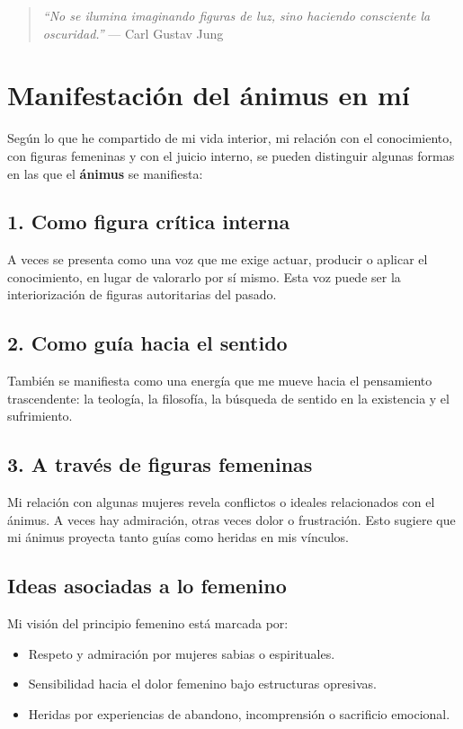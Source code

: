 \documentclass[12pt,a4paper]{article}
\begin{document}
	\begin{quote}
		\textit{“No se ilumina imaginando figuras de luz, sino haciendo consciente la oscuridad.”} — Carl Gustav Jung
	\end{quote}
	
	\section{Manifestación del ánimus en mí}
	
	Según lo que he compartido de mi vida interior, mi relación con el conocimiento, con figuras femeninas y con el juicio interno, se pueden distinguir algunas formas en las que el \textbf{ánimus} se manifiesta:
	
	\subsection*{1. Como figura crítica interna}
	A veces se presenta como una voz que me exige actuar, producir o aplicar el conocimiento, en lugar de valorarlo por sí mismo. Esta voz puede ser la interiorización de figuras autoritarias del pasado.
	
	\subsection*{2. Como guía hacia el sentido}
	También se manifiesta como una energía que me mueve hacia el pensamiento trascendente: la teología, la filosofía, la búsqueda de sentido en la existencia y el sufrimiento.
	
	\subsection*{3. A través de figuras femeninas}
	Mi relación con algunas mujeres revela conflictos o ideales relacionados con el ánimus. A veces hay admiración, otras veces dolor o frustración. Esto sugiere que mi ánimus proyecta tanto guías como heridas en mis vínculos.
	
	\subsection*{Ideas asociadas a lo femenino}
	Mi visión del principio femenino está marcada por:
	
	\begin{itemize}
		\item Respeto y admiración por mujeres sabias o espirituales.
		\item Sensibilidad hacia el dolor femenino bajo estructuras opresivas.
		\item Heridas por experiencias de abandono, incomprensión o sacrificio emocional.
	\end{itemize}
	
\end{document}
